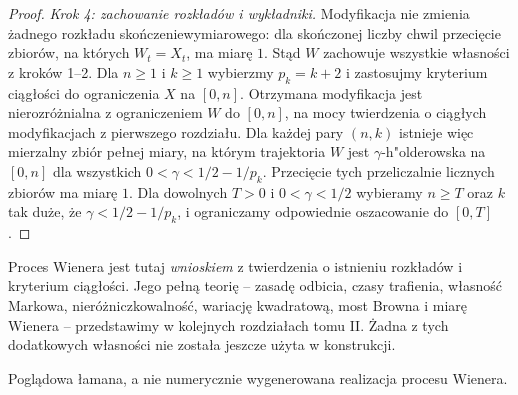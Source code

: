 \begin{proof}
\emph{Krok 4: zachowanie rozkładów i wykładniki.}
Modyfikacja nie zmienia żadnego rozkładu
skończeniewymiarowego: dla skończonej liczby chwil
przecięcie zbiorów, na których $W_t=X_t$, ma miarę $1$.
Stąd $W$ zachowuje wszystkie własności z kroków 1--2.
Dla $n\ge1$ i $k\ge1$ wybierzmy $p_k=k+2$ i zastosujmy
kryterium ciągłości do ograniczenia $X$ na $[0,n]$.
Otrzymana modyfikacja jest nierozróżnialna z ograniczeniem
$W$ do $[0,n]$, na mocy twierdzenia o ciągłych
modyfikacjach z pierwszego rozdziału. Dla każdej pary
$(n,k)$ istnieje więc mierzalny zbiór pełnej miary,
na którym trajektoria $W$ jest $\gamma$-h"olderowska
na $[0,n]$ dla wszystkich $0<\gamma<1/2-1/p_k$.
Przecięcie tych przeliczalnie licznych zbiorów ma miarę $1$.
Dla dowolnych $T>0$ i $0<\gamma<1/2$ wybieramy
$n\ge T$ oraz $k$ tak duże, że $\gamma<1/2-1/p_k$,
i ograniczamy odpowiednie oszacowanie do $[0,T]$.
\end{proof}

\begin{uwaga}
Proces Wienera jest tutaj \emph{wnioskiem} z twierdzenia
o istnieniu rozkładów i kryterium ciągłości.
Jego pełną teorię -- zasadę odbicia, czasy trafienia,
własność Markowa, nieróżniczkowalność, wariację
kwadratową, most Browna i miarę Wienera --
przedstawimy w kolejnych rozdziałach tomu II.
Żadna z tych dodatkowych własności nie została
jeszcze użyta w konstrukcji.
\end{uwaga}

\begin{center}
\par\smallskip\small Poglądowa łamana, a nie numerycznie wygenerowana realizacja procesu Wienera.
\end{center}

